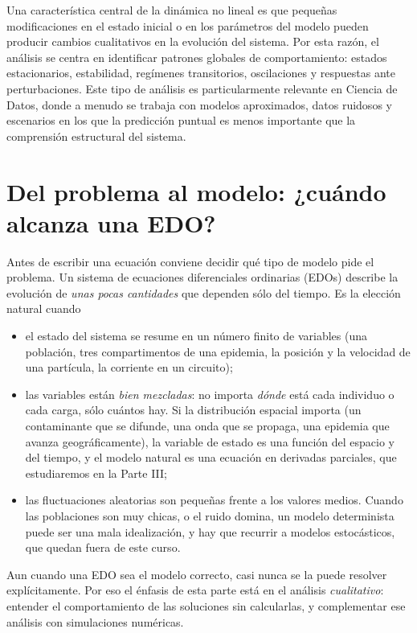 \documentclass[12pt, a4paper]{amsbook}
\theoremstyle{remark}
\theoremstyle{definition}
\numberwithin{section}{chapter}
\numberwithin{subsection}{section}
\numberwithin{equation}{section}
\numberwithin{figure}{chapter}
\begin{document}
Una característica central de la dinámica no lineal es que pequeñas modificaciones en el estado inicial o en los parámetros del modelo pueden producir cambios cualitativos en la evolución del sistema. Por esta razón, el análisis se centra en identificar patrones globales de comportamiento: estados estacionarios, estabilidad, regímenes transitorios, oscilaciones y respuestas ante perturbaciones. Este tipo de análisis es particularmente relevante en Ciencia de Datos, donde a menudo se trabaja con modelos aproximados, datos ruidosos y escenarios en los que la predicción puntual es menos importante que la comprensión estructural del sistema.

\section{Del problema al modelo: ¿cuándo alcanza una EDO?}

Antes de escribir una ecuación conviene decidir qué tipo de modelo pide el problema. Un sistema de ecuaciones diferenciales ordinarias (EDOs) describe la evolución de \emph{unas pocas cantidades} que dependen sólo del tiempo. Es la elección natural cuando
\begin{itemize}
\item el estado del sistema se resume en un número finito de variables (una población, tres compartimentos de una epidemia, la posición y la velocidad de una partícula, la corriente en un circuito);
\item las variables están \emph{bien mezcladas}: no importa \emph{dónde} está cada individuo o cada carga, sólo cuántos hay. Si la distribución espacial importa (un contaminante que se difunde, una onda que se propaga, una epidemia que avanza geográficamente), la variable de estado es una función del espacio y del tiempo, y el modelo natural es una ecuación en derivadas parciales, que estudiaremos en la Parte III;
\item las fluctuaciones aleatorias son pequeñas frente a los valores medios. Cuando las poblaciones son muy chicas, o el ruido domina, un modelo determinista puede ser una mala idealización, y hay que recurrir a modelos estocásticos, que quedan fuera de este curso.
\end{itemize}
Aun cuando una EDO sea el modelo correcto, casi nunca se la puede resolver explícitamente. Por eso el énfasis de esta parte está en el análisis \emph{cualitativo}: entender el comportamiento de las soluciones sin calcularlas, y complementar ese análisis con simulaciones numéricas.
\end{document}
